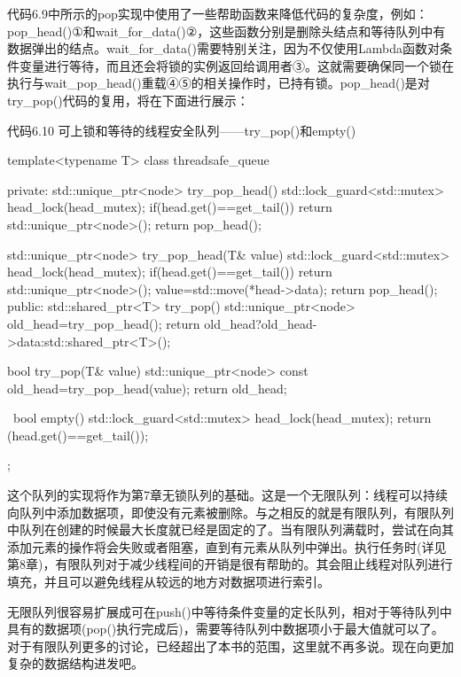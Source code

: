 代码6.9中所示的pop实现中使用了一些帮助函数来降低代码的复杂度，例如：pop\_head()①和wait\_for\_data()②，这些函数分别是删除头结点和等待队列中有数据弹出的结点。wait\_for\_data()需要特别关注，因为不仅使用Lambda函数对条件变量进行等待，而且还会将锁的实例返回给调用者③。这就需要确保同一个锁在执行与wait\_pop\_head()重载④⑤的相关操作时，已持有锁。pop\_head()是对try\_pop()代码的复用，将在下面进行展示：

代码6.10 可上锁和等待的线程安全队列——try\_pop()和empty()

\begin{cpp}
template<typename T>
class threadsafe_queue
{
private:
  std::unique_ptr<node> try_pop_head()
  {
    std::lock_guard<std::mutex> head_lock(head_mutex);
    if(head.get()==get_tail())
    {
      return std::unique_ptr<node>();
    }
    return pop_head();
  }

  std::unique_ptr<node> try_pop_head(T& value)
  {
    std::lock_guard<std::mutex> head_lock(head_mutex);
    if(head.get()==get_tail())
    {
      return std::unique_ptr<node>();
    }
    value=std::move(*head->data);
    return pop_head();
  }
public:
  std::shared_ptr<T> try_pop()
  {
    std::unique_ptr<node> old_head=try_pop_head();
    return old_head?old_head->data:std::shared_ptr<T>();
  }

  bool try_pop(T& value)
  {
    std::unique_ptr<node> const old_head=try_pop_head(value);
    return old_head;
  }

  bool empty()
  {
    std::lock_guard<std::mutex> head_lock(head_mutex);
    return (head.get()==get_tail());
  }
};
\end{cpp}

这个队列的实现将作为第7章无锁队列的基础。这是一个无限队列：线程可以持续向队列中添加数据项，即使没有元素被删除。与之相反的就是有限队列，有限队列中队列在创建的时候最大长度就已经是固定的了。当有限队列满载时，尝试在向其添加元素的操作将会失败或者阻塞，直到有元素从队列中弹出。执行任务时(详见第8章)，有限队列对于减少线程间的开销是很有帮助的。其会阻止线程对队列进行填充，并且可以避免线程从较远的地方对数据项进行索引。

无限队列很容易扩展成可在push()中等待条件变量的定长队列，相对于等待队列中具有的数据项(pop()执行完成后)，需要等待队列中数据项小于最大值就可以了。对于有限队列更多的讨论，已经超出了本书的范围，这里就不再多说。现在向更加复杂的数据结构进发吧。
